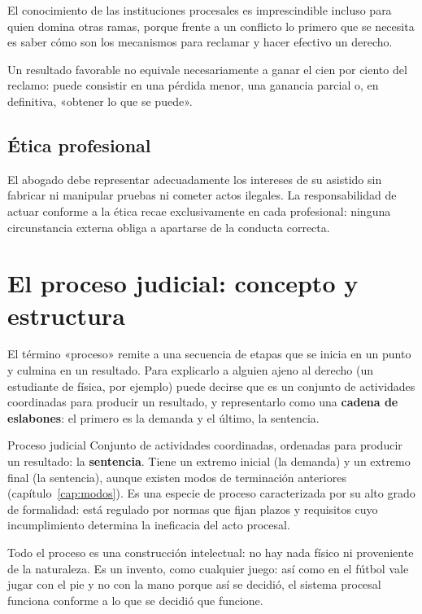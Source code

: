 \documentclass[12pt,oneside]{book}
\begin{document}
El conocimiento de las instituciones procesales es imprescindible incluso para quien domina otras ramas, porque frente a un conflicto lo primero que se necesita es saber cómo son los mecanismos para reclamar y hacer efectivo un derecho.

\begin{importante}
Un resultado favorable no equivale necesariamente a ganar el cien por ciento del reclamo: puede consistir en una pérdida menor, una ganancia parcial o, en definitiva, «obtener lo que se puede».
\end{importante}

\subsection{Ética profesional}

El abogado debe representar adecuadamente los intereses de su asistido sin fabricar ni manipular pruebas ni cometer actos ilegales. La responsabilidad de actuar conforme a la ética recae exclusivamente en cada profesional: ninguna circunstancia externa obliga a apartarse de la conducta correcta.

\section{El proceso judicial: concepto y estructura}\label{sec:concepto-proceso}

El término «proceso» remite a una secuencia de etapas que se inicia en un punto y culmina en un resultado. Para explicarlo a alguien ajeno al derecho (un estudiante de física, por ejemplo) puede decirse que es un conjunto de actividades coordinadas para producir un resultado, y representarlo como una \textbf{cadena de eslabones}: el primero es la demanda y el último, la sentencia.

\begin{definicion}{Proceso judicial}
Conjunto de actividades coordinadas, ordenadas para producir un resultado: la \textbf{sentencia}. Tiene un extremo inicial (la demanda) y un extremo final (la sentencia), aunque existen modos de terminación anteriores (capítulo~\ref{cap:modos}). Es una especie de proceso caracterizada por su alto grado de formalidad: está regulado por normas que fijan plazos y requisitos cuyo incumplimiento determina la ineficacia del acto procesal.
\end{definicion}

\begin{nota}
Todo el proceso es una construcción intelectual: no hay nada físico ni proveniente de la naturaleza. Es un invento, como cualquier juego: así como en el fútbol vale jugar con el pie y no con la mano porque así se decidió, el sistema procesal funciona conforme a lo que se decidió que funcione.
\end{nota}
\end{document}
